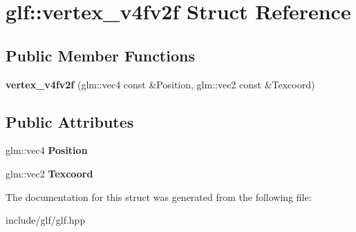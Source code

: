 \hypertarget{structglf_1_1vertex__v4fv2f}{\section{glf\-:\-:vertex\-\_\-v4fv2f Struct Reference}
\label{structglf_1_1vertex__v4fv2f}
}
\subsection*{Public Member Functions}
\begin{DoxyCompactItemize}
\item 
\hypertarget{structglf_1_1vertex__v4fv2f_a239189352f926b8360f0e5ea67ae71fe}{{\bfseries vertex\-\_\-v4fv2f} (glm\-::vec4 const \&Position, glm\-::vec2 const \&Texcoord)}\label{structglf_1_1vertex__v4fv2f_a239189352f926b8360f0e5ea67ae71fe}

\end{DoxyCompactItemize}
\subsection*{Public Attributes}
\begin{DoxyCompactItemize}
\item 
\hypertarget{structglf_1_1vertex__v4fv2f_a44febe63492ff5106d89332f3f814e70}{glm\-::vec4 {\bfseries Position}}\label{structglf_1_1vertex__v4fv2f_a44febe63492ff5106d89332f3f814e70}

\item 
\hypertarget{structglf_1_1vertex__v4fv2f_ac5c0129a38e461fc3e715d5de81c6023}{glm\-::vec2 {\bfseries Texcoord}}\label{structglf_1_1vertex__v4fv2f_ac5c0129a38e461fc3e715d5de81c6023}

\end{DoxyCompactItemize}


The documentation for this struct was generated from the following file\-:\begin{DoxyCompactItemize}
\item 
include/glf/glf.\-hpp\end{DoxyCompactItemize}
